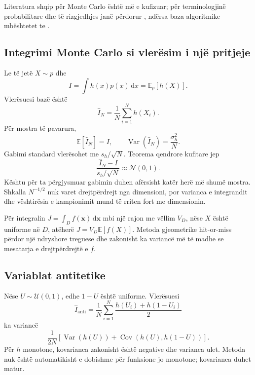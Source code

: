 \documentclass[11pt,oneside,openany]{book}
\newcommand{\vect}[1]{\bm{#1}}
\newcommand{\E}{\mathbb{E}}
\newcommand{\Var}{\operatorname{Var}}
\newcommand{\Cov}{\operatorname{Cov}}
\newcommand{\dd}{\,\mathrm{d}}
\begin{document}
Literatura shqip për Monte Carlo është më e kufizuar; për terminologjinë probabilitare dhe të rizgjedhjes janë përdorur \cite{butka,tasho,hyka}, ndërsa baza algoritmike mbështetet te \cite{newman,robert,press}.



\subsection{Integrimi Monte Carlo si vlerësim i një pritjeje}
Le të jetë $X\sim p$ dhe
\begin{equation}
 I=\int h(x)p(x)\dd x=\E_p[h(X)].
\end{equation}
Vlerësuesi bazë është
\begin{equation}
 \widehat I_N=\frac1N\sum_{i=1}^{N}h(X_i).
\end{equation}
Për mostra të pavarura,
\begin{equation}
 \E[\widehat I_N]=I,
 \qquad
 \Var(\widehat I_N)=\frac{\sigma_h^2}{N}.
\end{equation}
Gabimi standard vlerësohet me $s_h/\sqrt N$. Teorema qendrore kufitare jep
\begin{equation}
 \frac{\widehat I_N-I}{s_h/\sqrt N}\approx\mathcal N(0,1).
\end{equation}
Kështu për ta përgjysmuar gabimin duhen afërsisht katër herë më shumë mostra. Shkalla $N^{-1/2}$ nuk varet drejtpërdrejt nga dimensioni, por varianca e integrandit dhe vështirësia e kampionimit mund të rriten fort me dimensionin.

Për integralin $J=\int_D f(\vect x)\dd\vect x$ mbi një rajon me vëllim $V_D$, nëse $X$ është uniforme në $D$, atëherë $J=V_D\E[f(X)]$. Metoda gjeometrike hit-or-miss përdor një ndryshore treguese dhe zakonisht ka variancë më të madhe se mesatarja e drejtpërdrejtë e $f$.

\subsection{Variablat antitetike}
Nëse $U\sim\mathcal U(0,1)$, edhe $1-U$ është uniforme. Vlerësuesi
\begin{equation}
 \widehat I_{\mathrm{anti}}=\frac1N\sum_{i=1}^{N}
 \frac{h(U_i)+h(1-U_i)}{2}
\end{equation}
ka variancë
\begin{equation}
 \frac{1}{2N}\left[\Var(h(U))+\Cov(h(U),h(1-U))\right].
\end{equation}
Për $h$ monotone, kovarianca zakonisht është negative dhe varianca ulet. Metoda nuk është automatikisht e dobishme për funksione jo monotone; kovarianca duhet matur.
\end{document}
